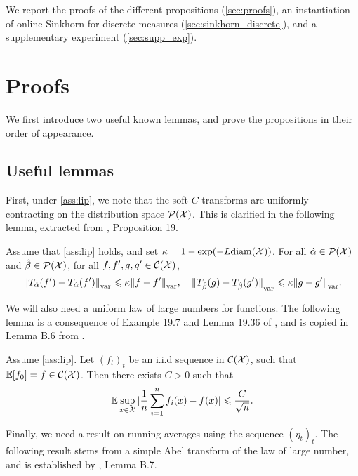 We report the proofs of the different propositions (\autoref{sec:proofs}), an instantiation of online Sinkhorn for discrete measures (\autoref{sec:sinkhorn_discrete}), and a supplementary experiment (\autoref{sec:supp_exp}).

\section{Proofs}\label{sec:proofs}

We first introduce two useful known lemmas, and prove the propositions in their order of appearance.

\subsection{Useful lemmas}

First, under \autoref{ass:lip}, we note that the soft $C$-transforms are
 uniformly contracting on the distribution space $\mathcal{P}(\mathcal{X})$. This is clarified
 in the following lemma, extracted from \citet{vialard2019elementary},
 Proposition 19.

\begin{lemma}\label{lemma:contractance}
    Assume that \autoref{ass:lip} holds, and set $\kappa = 1 - \exp(-L
    \textnormal{diam}(\mathcal{X}))$. For all $\hat \alpha \in \mathcal{P}(\mathcal{X})$ and $\hat \beta \in
    \mathcal{P}(\mathcal{X})$, for all $f, f', g, g' \in \mathcal{C}(\mathcal{X})$,
    \begin{equation}
        {\Vert T_{\hat \alpha}(f') - 
        T_{\hat \alpha}(f') \Vert}_{\text{\upshape var}} \leqslant \kappa {\Vert f - f' \Vert}_{\text{\upshape var}},
        \quad
        {\Vert T_{\hat \beta}(g) - 
        T_{\hat \beta}(g') \Vert}_{\text{\upshape var}} \leqslant \kappa {\Vert g - g' \Vert}_{\text{\upshape var}}.
    \end{equation}
\end{lemma}

We will also need a uniform law of large numbers for functions. The following lemma is a consequence of Example 19.7 and
Lemma 19.36 of \citet{van_der_vaart_asymptotic_2000}, and is copied in Lemma B.6 from \citet{mairal_stochastic_2013}.

\begin{lemma}\label{lemma:lln}
    Assume \autoref{ass:lip}. Let $(f_t)_t$ be an i.i.d sequence in $\mathcal{C}(\mathcal{X})$,
    such that $\mathbb{E}[f_0] = f \in \mathcal{C}(\mathcal{X})$. Then there exists $C > 0$ such that
    \begin{equation}
        \mathbb{E} \sup_{x \in \mathcal{X}} | \frac{1}{n} \sum_{i=1}^n f_i(x) - f(x) |
        \leqslant \frac{C}{\sqrt{n}}.
    \end{equation}
\end{lemma}
Finally, we need a result on running averages using the sequence ${(\eta_t)}_t$. The following result stems from a simple Abel transform of the law of large number, and is established by \citet{mairal_stochastic_2013}, Lemma B.7.

